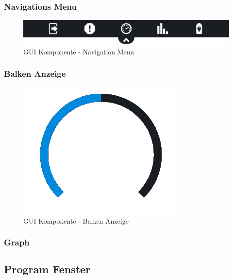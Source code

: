 \subsubsection{Navigations Menu}

\begin{figure}[H]
	\begin{center}
		\includegraphics[scale=0.2]{figures/hcis/component_menu.png}
		\caption{GUI Komponente - Navigation Menu}
		\label{fig:kompNavigation}
	\end{center}
\end{figure}

\subsubsection{Balken Anzeige}

\begin{figure}[H]
	\begin{center}
		\includegraphics[scale=0.5]{figures/hcis/component_bar.png}
		\caption{GUI Komponente - Balken Anzeige}
				\label{fig:kompBalken}
	\end{center}
\end{figure}

\subsubsection{Graph}

\newpage

\subsection{Program Fenster}

